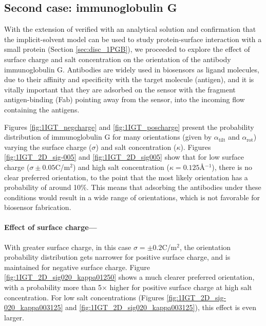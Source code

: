  \subsection{Second case: immunoglobulin G}
 
 With the extension of \pygbe verified with an analytical solution\cite{CooperBarba2015a} and confirmation that the implicit-solvent model can be used to study protein-surface interaction with a small protein (Section \ref{sec:disc_1PGB}), we proceeded to explore the effect of surface charge and salt concentration on the orientation of the antibody immunoglobulin G. Antibodies are widely used in biosensors as ligand molecules, due to their affinity and specificity with the target molecule (antigen), and it is vitally important that they are adsorbed on the sensor with the fragment antigen-binding (Fab) pointing away from the sensor, into the incoming flow containing the antigens.
 
 Figures \ref{fig:1IGT_negcharge} and \ref{fig:1IGT_poscharge} present the probability distribution of immunoglobulin G for many orientations (given by $\alpha_\text{tilt}$ and $\alpha_\text{rot}$) varying the surface charge ($\sigma$) and salt concentration ($\kappa$). Figures \ref{fig:1IGT_2D_sig-005} and \ref{fig:1IGT_2D_sig005} show that for low surface charge ($\sigma \pm 0.05$C/m$^2$) and high salt concentration ($\kappa=0.125$\AA$^{-1}$), there is no clear preferred orientation, to the point that the most likely orientation has a probability of around 10\%. This means that adsorbing the antibodies under these conditions would result in a wide range of orientations, which is not favorable for biosensor fabrication.
 
 \medskip
 
 \paragraph*{Effect of surface charge---}
 
 With greater surface charge, in this case $\sigma=\pm0.2$C/m$^2$, the orientation probability distribution gets narrower for positive surface charge, and is maintained for negative surface charge. Figure \ref{fig:1IGT_2D_sig020_kappa01250} shows a much clearer preferred orientation, with a probability more than 5$\times$ higher for positive surface charge at high salt concentration. For low salt concentrations (Figures \ref{fig:1IGT_2D_sig-020_kappa003125} and \ref{fig:1IGT_2D_sig020_kappa003125}), this effect is even larger. 
 
